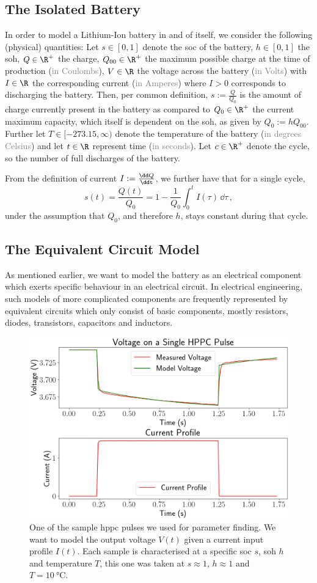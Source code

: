 \documentclass{prettytex/ox/mmsc-special-topic}
\begin{document}
  \subsection{The Isolated Battery}
  In order to model a Lithium-Ion battery in and of itself, we consider the following (physical) quantities:
  Let
  $s \in [0, 1]$ denote the \glsdesc{soc} of the battery,
  $h \in [0, 1]$ the \glsdesc{soh},
  $Q \in \R^+$ the charge,
  $Q_{00} \in \R^+$ the maximum possible charge at the time of production (\textcolor{gray}{in Coulombs}),
  $V \in \R$ the voltage across the battery (\textcolor{gray}{in Volts}) with
  $I \in \R$ the corresponding current (\textcolor{gray}{in Amperes}) where $I > 0$ corresponds to discharging the battery.
  Then, per common definition, $s := \frac{Q}{Q_0}$ is the amount of charge currently present in the battery as compared to $Q_0 \in \R^+$ the current maximum capacity, which itself is dependent on the \gls{soh}, as given by $Q_0 := h Q_{00}$.
  Further let
  $T \in [-273.15, \infty)$ denote the temperature of the battery (\textcolor{gray}{in degrees Celsius}) and
  let $t \in \R$ represent time (\textcolor{gray}{in seconds}).
  Let $c \in \R^+$ denote the cycle, so the number of full discharges of the battery.

  From the definition of current $I := \frac{\dd Q}{\ddt}$, we further have that for a single cycle,
  $$s(t) = \frac{Q(t)}{Q_0} = 1 - \frac{1}{Q_0} \int_0^t I(\tau) \,\dd\tau \,,$$
  under the assumption that $Q_0$, and therefore $h$, stays constant during that cycle.

  \subsection{The Equivalent Circuit Model}
  As mentioned earlier, we want to model the battery as an electrical component which exerts specific behaviour in an electrical circuit.
  In electrical engineering, such models of more complicated components are frequently represented by equivalent circuits which only consist of basic components, mostly resistors, diodes, transistors, capacitors and inductors.

  \begin{figure}[H]
    \centering
    \includegraphics[width=0.6\linewidth]{figures/hppc-pulse.png}
    \caption{One of the sample \gls{hppc} pulses we used for parameter finding. We want to model the output voltage $V(t)$ given a current input profile $I(t)$. Each sample is characterised at a specific \glsdesc{soc} $s$, \glsdesc{soh} $h$ and temperature $T$, this one was taken at $s \approx 1$, $h \approx 1$ and $T = \SI{10}{\degreeCelsius}$.}
    \label{fig:hppc-pulse}
  \end{figure}
\end{document}
